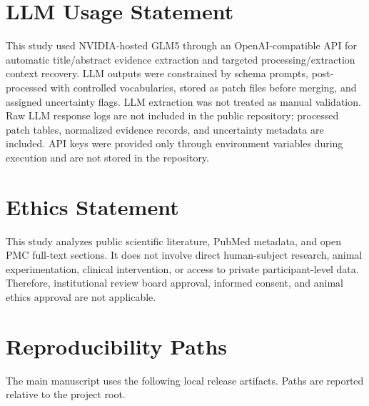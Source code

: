 \documentclass[11pt]{article}
\begin{document}
\section*{LLM Usage Statement}

This study used NVIDIA-hosted GLM5 through an OpenAI-compatible API for automatic title/abstract evidence extraction and targeted processing/extraction context recovery. LLM outputs were constrained by schema prompts, post-processed with controlled vocabularies, stored as patch files before merging, and assigned uncertainty flags. LLM extraction was not treated as manual validation. Raw LLM response logs are not included in the public repository; processed patch tables, normalized evidence records, and uncertainty metadata are included. API keys were provided only through environment variables during execution and are not stored in the repository.

\section*{Ethics Statement}

This study analyzes public scientific literature, PubMed metadata, and open PMC full-text sections. It does not involve direct human-subject research, animal experimentation, clinical intervention, or access to private participant-level data. Therefore, institutional review board approval, informed consent, and animal ethics approval are not applicable.

\appendix

\section{Reproducibility Paths}
\label{app:reproducibility}

The main manuscript uses the following local release artifacts. Paths are reported relative to the project root.
\end{document}
